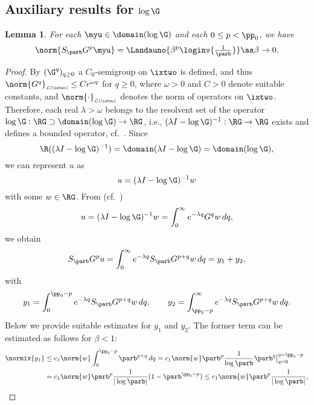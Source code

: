 \documentclass[10pt]{article}
\newtheorem{lemma}[theorem]{Lemma}
\theoremstyle{definition}
\begin{document}
\subsection{Auxiliary results for $ \log \G $}
\begin{lemma}
\label{th:low-order-rate}
For each $ \myu \in \domain(\log \G) $ and each $ 0 \le p < \pp_0 $, we have
$$
\norm{ S_\parb G^p \myu  } =
\Landauno{\beta^p \loginv{\tfrac{1}{\parb}}}
\as \beta \to 0.
$$
\end{lemma}
%
%
\begin{proof}
By $ (\G^q)_{q \ge 0} $ a $ C_0 $-semigroup on $\ixtwo $ is defined, and thus
$ \norm{G^q}_{\scriptscriptstyle \mathcal{L}(\ixtwo)} \le C e^{\omega q} $ for $ q \ge 0 $,
where $ \omega > 0 $ and $ C > 0 $ denote suitable constants, and $ \norm{\cdot}_{\scriptscriptstyle \mathcal{L}(\ixtwo)} $ denotes the norm of operators on $ \ixtwo $.
Therefore, each real $ \lambda > \omega $ belongs to the resolvent set of the operator $ \log \G: \RG \supset \domain(\log \G) \to \RG $, i.e.,
$ (\lambda I - \log \G)^{-1}: \RG \to \RG $ exists and defines a bounded operator,
cf.~\cite[Theorem 5.3, Chapter~1]{Pazy83}.
Since
$$ \R((\lambda I - \log \G)^{-1}) = \domain (\lambda I - \log \G) = \domain( \log \G), $$
%
we can represent $ u $ as
$$ u = (\lambda I - \log \G)^{-1}w $$
%
with some $ w \in \RG $. From (cf.~\cite[proof of Theorem 5.3, Chapter 1]{Pazy83})
$$  u = (\lambda I - \log \G)^{-1}w = \int_0^\infty e^{-\lambda q} G^q w \, dq, $$
%
%
we obtain
%
\begin{align*}
S_\parb G^p u = \int_0^\infty e^{-\lambda q} S_\parb G^{p+q} w \, dq = y_1 + y_2,
\end{align*}
%
with
%
\begin{align*}
y_1 = \int_0^{\pp_0-p} e^{-\lambda q} S_\parb G^{p+q} w \, dq,
\qquad y_2 = \int_{\pp_0-p}^\infty e^{-\lambda q} S_\parb G^{p+q} w \, dq.
\end{align*}
%
Below we provide suitable estimates for $ y_1 $ and $ y_2 $.
The former term can be estimated as follows for $ \beta < 1 $:
%
\begin{align*}
\normix{y_1} & \le  c_1 \norm{w} \int_0^{\pp_0-p}  \parb^{p+q}\, dq =
c_1 \norm{w} \parb^p \frac{1}{\log \parb} \parb^q \big\vert_{q=0}^{q=\pp_0-p}
\\
& = c_1 \norm{w}  \parb^p \frac{1}{\vert \log \parb \vert} (1-\parb^{\pp_0-p})
\le c_1 \norm{w}  \parb^p \frac{1}{\vert \log \parb \vert},
\end{align*}

\end{proof}
\end{document}
